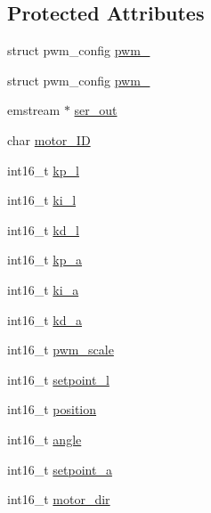 \subsection*{Protected Attributes}
\begin{DoxyCompactItemize}
\item 
struct pwm\+\_\+config \mbox{\hyperlink{classmotorDriver_a9522f9112a5281698efee54ec4d23a8d}{pwm\+\_}}
\item 
struct pwm\+\_\+config \mbox{\hyperlink{classmotorDriver_a7b86ba5d54e991cbc79cf936f5c225f2}{pwm\+\_}}
\item 
emstream $\ast$ \mbox{\hyperlink{classmotorDriver_a30b31378644a7e2ae943f953165adcf7}{ser\+\_\+out}}
\item 
char \mbox{\hyperlink{classmotorDriver_a8f014e8a6c08db461ea445b5c827c247}{motor\+\_\+\+ID}}
\item 
int16\+\_\+t \mbox{\hyperlink{classmotorDriver_a4e1437c476209d17f804e7ebe6a82414}{kp\+\_\+l}}
\item 
int16\+\_\+t \mbox{\hyperlink{classmotorDriver_a6f35f045ff1b9ad15a7e25fb06423143}{ki\+\_\+l}}
\item 
int16\+\_\+t \mbox{\hyperlink{classmotorDriver_a4c7c759295dc91ddfbd95d7f68251613}{kd\+\_\+l}}
\item 
int16\+\_\+t \mbox{\hyperlink{classmotorDriver_a6c6003ba49477ac2fa07a997af31db3a}{kp\+\_\+a}}
\item 
int16\+\_\+t \mbox{\hyperlink{classmotorDriver_acac05ca0ce9a687efb3d7469cc378e46}{ki\+\_\+a}}
\item 
int16\+\_\+t \mbox{\hyperlink{classmotorDriver_aab85058af216f925e9bffc78ed89bc0a}{kd\+\_\+a}}
\item 
int16\+\_\+t \mbox{\hyperlink{classmotorDriver_ab25c45eb1c877d431f375f9584f7842d}{pwm\+\_\+scale}}
\item 
int16\+\_\+t \mbox{\hyperlink{classmotorDriver_ab6f8668c8137d2a8a4eb51e747466465}{setpoint\+\_\+l}}
\item 
int16\+\_\+t \mbox{\hyperlink{classmotorDriver_abbec1c2a55941af5ed8837c12ed73529}{position}}
\item 
int16\+\_\+t \mbox{\hyperlink{classmotorDriver_adac3e08603f6946acf32d764eddc0105}{angle}}
\item 
int16\+\_\+t \mbox{\hyperlink{classmotorDriver_adecf277f71f6f214bc6b920d113a05ee}{setpoint\+\_\+a}}
\item 
int16\+\_\+t \mbox{\hyperlink{classmotorDriver_ae38f3809514145607d1d79e7513517e5}{motor\+\_\+dir}}
\item 

\end{DoxyCompactItemize}
